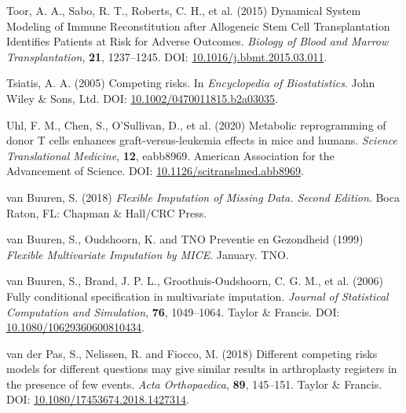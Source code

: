 \documentclass[
  letterpaper,
  DIV=11,
  numbers=noendperiod]{scrreprt}
\newlength{\cslhangindent}
\newlength{\cslentryspacingunit} %
\newenvironment{CSLReferences}[2] %
 {%
  \setlength{\parindent}{0pt}
  \ifodd #1
  \let\oldpar\par
  \def\par{\hangindent=\cslhangindent\oldpar}
  \fi
  \setlength{\parskip}{#2\cslentryspacingunit}
 }%
 {}
\begin{document}
\begin{CSLReferences}{1}{0}
\leavevmode{}%
Toor, A. A., Sabo, R. T., Roberts, C. H., et al. (2015) Dynamical
{System Modeling} of {Immune Reconstitution} after {Allogeneic Stem Cell
Transplantation Identifies Patients} at {Risk} for {Adverse Outcomes}.
\emph{Biology of Blood and Marrow Transplantation}, \textbf{21},
1237--1245. DOI:
\href{https://doi.org/10.1016/j.bbmt.2015.03.011}{10.1016/j.bbmt.2015.03.011}.

\leavevmode{}%
Tsiatis, A. A. (2005) Competing risks. In \emph{Encyclopedia of
Biostatistics}. John Wiley \& Sons, Ltd. DOI:
\href{https://doi.org/10.1002/0470011815.b2a03035}{10.1002/0470011815.b2a03035}.

\leavevmode{}%
Uhl, F. M., Chen, S., O'Sullivan, D., et al. (2020) Metabolic
reprogramming of donor {T} cells enhances graft-versus-leukemia effects
in mice and humans. \emph{Science Translational Medicine}, \textbf{12},
eabb8969. American Association for the Advancement of Science. DOI:
\href{https://doi.org/10.1126/scitranslmed.abb8969}{10.1126/scitranslmed.abb8969}.

\leavevmode{}%
van Buuren, S. (2018) \emph{Flexible Imputation of Missing Data.
{Second} Edition}. Boca Raton, FL: Chapman \& Hall/CRC Press.

\leavevmode{}%
van Buuren, S., Oudshoorn, K. and TNO Preventie en Gezondheid (1999)
\emph{Flexible {Multivariate Imputation} by {MICE}}. January. TNO.

\leavevmode{}%
van Buuren, S., Brand, J. P. L., Groothuis-Oudshoorn, C. G. M., et al.
(2006) Fully conditional specification in multivariate imputation.
\emph{Journal of Statistical Computation and Simulation}, \textbf{76},
1049--1064. Taylor \& Francis. DOI:
\href{https://doi.org/10.1080/10629360600810434}{10.1080/10629360600810434}.

\leavevmode{}%
van der Pas, S., Nelissen, R. and Fiocco, M. (2018) Different competing
risks models for different questions may give similar results in
arthroplasty registers in the presence of few events. \emph{Acta
Orthopaedica}, \textbf{89}, 145--151. Taylor \& Francis. DOI:
\href{https://doi.org/10.1080/17453674.2018.1427314}{10.1080/17453674.2018.1427314}.


\end{CSLReferences}
\end{document}
